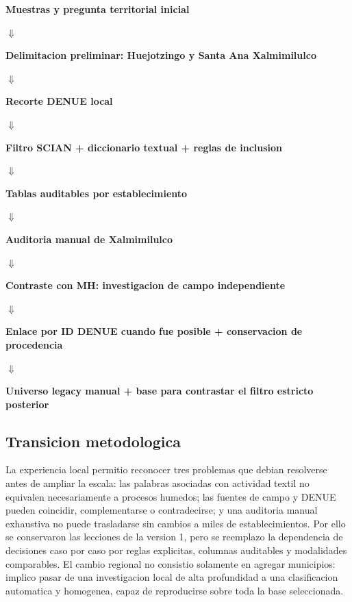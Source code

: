 \documentclass[11pt,letterpaper]{article}
\begin{document}
\begin{center}
\begin{tcolorbox}[
  width=0.92\textwidth,
  colback=AtoyacLight,
  colframe=AtoyacBlue,
  title={Diagrama 1. Flujo de la version 1: estudio local e intensivo},
  fonttitle=\bfseries
]
\centering
\textbf{Muestras y pregunta territorial inicial}\par
$\Downarrow$\par
\textbf{Delimitacion preliminar: Huejotzingo y Santa Ana Xalmimilulco}\par
$\Downarrow$\par
\textbf{Recorte DENUE local}\par
$\Downarrow$\par
\textbf{Filtro SCIAN + diccionario textual + reglas de inclusion}\par
$\Downarrow$\par
\textbf{Tablas auditables por establecimiento}\par
$\Downarrow$\par
\textbf{Auditoria manual de Xalmimilulco}\par
$\Downarrow$\par
\textbf{Contraste con MH: investigacion de campo independiente}\par
$\Downarrow$\par
\textbf{Enlace por ID DENUE cuando fue posible + conservacion de procedencia}\par
$\Downarrow$\par
\textbf{Universo legacy manual + base para contrastar el filtro estricto posterior}
\end{tcolorbox}
\end{center}

\subsection{Transicion metodologica}

La experiencia local permitio reconocer tres problemas que debian resolverse antes de ampliar la escala: las palabras asociadas con actividad textil no equivalen necesariamente a procesos humedos; las fuentes de campo y DENUE pueden coincidir, complementarse o contradecirse; y una auditoria manual exhaustiva no puede trasladarse sin cambios a miles de establecimientos. Por ello se conservaron las lecciones de la version 1, pero se reemplazo la dependencia de decisiones caso por caso por reglas explicitas, columnas auditables y modalidades comparables. El cambio regional no consistio solamente en agregar municipios: implico pasar de una investigacion local de alta profundidad a una clasificacion automatica y homogenea, capaz de reproducirse sobre toda la base seleccionada.
\end{document}
